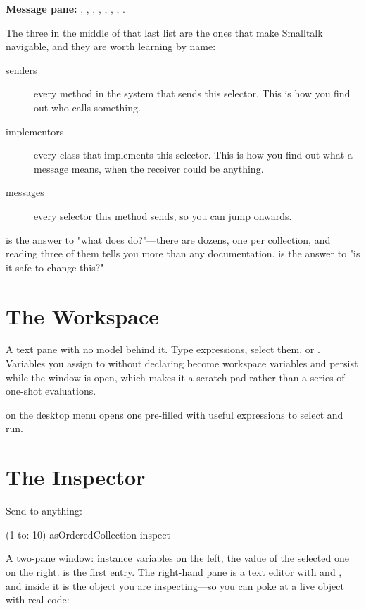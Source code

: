 \textbf{Message pane:} , , ,
, , , , .

The three in the middle of that last list are the ones that make Smalltalk
navigable, and they are worth learning by name:

\begin{description}
\item[senders] every method in the system that sends this selector. This is
  how you find out who calls something.
\item[implementors] every class that implements this selector. This is how you
  find out what a message means, when the receiver could be anything.
\item[messages] every selector this method sends, so you can jump onwards.
\end{description}

\begin{stnote}
 is the answer to "what does  do?"---there are
dozens, one per collection, and reading three of them tells you more than any
documentation.  is the answer to "is it safe to change this?"
\end{stnote}

\section{The Workspace}

A text pane with no model behind it. Type expressions, select them, 
or . Variables you assign to without declaring become workspace
variables and persist while the window is open, which makes it a scratch pad
rather than a series of one-shot evaluations.

 on the desktop menu opens one pre-filled with useful
expressions to select and run.

\section{The Inspector}

Send  to anything:

\begin{st}
(1 to: 10) asOrderedCollection inspect
\end{st}

A two-pane window: instance variables on the left, the value of the selected
one on the right.  is the first entry. The right-hand pane is a text
editor with  and , and inside it  is the
object you are inspecting---so you can poke at a live object with real code:

